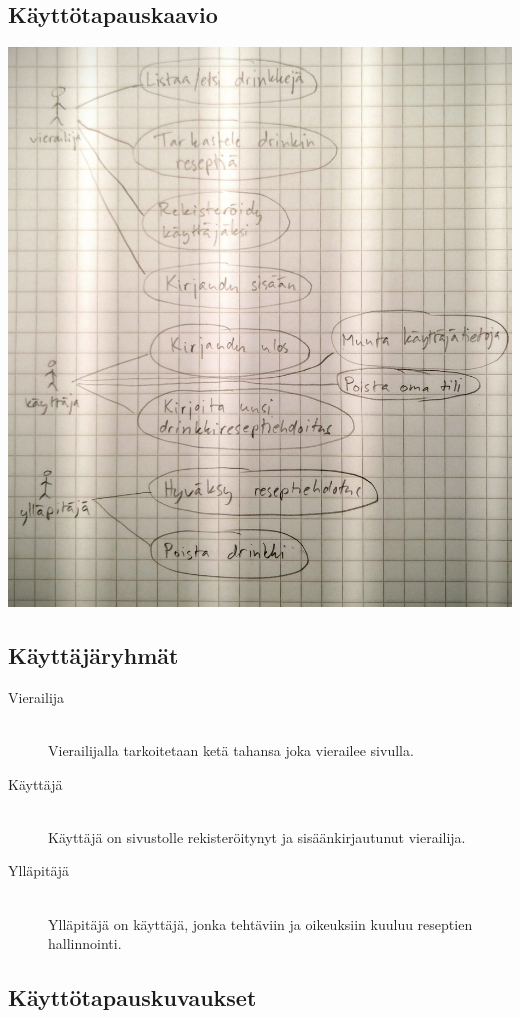 \documentclass[a4paper]{article}
\begin{document}
\subsection{Käyttötapauskaavio}
\includegraphics[width=\textwidth]{usecase-diagram}

\subsection{Käyttäjäryhmät}
\begin{description}
  \item[Vierailija] \hfill \\ Vierailijalla tarkoitetaan ketä tahansa joka vierailee sivulla.
  \item[Käyttäjä] \hfill \\ Käyttäjä on sivustolle rekisteröitynyt ja sisäänkirjautunut vierailija.
  \item[Ylläpitäjä] \hfill \\ Ylläpitäjä on käyttäjä, jonka tehtäviin ja oikeuksiin kuuluu reseptien hallinnointi.
\end{description}

\subsection{Käyttötapauskuvaukset}
\end{document}
